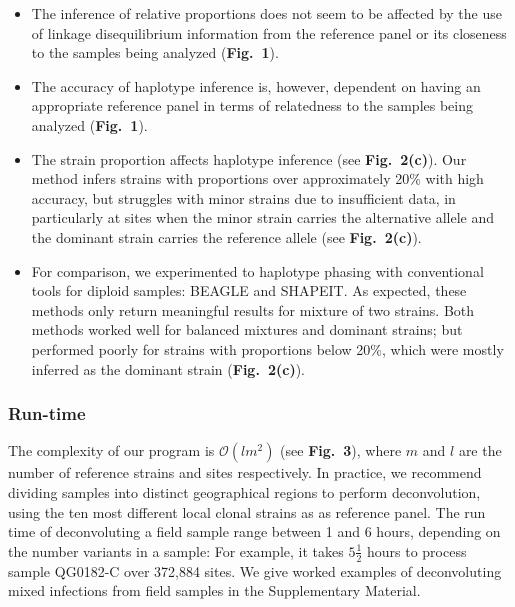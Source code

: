 \documentclass{nature}
\begin{document}
\begin{itemize}

\item The inference of relative proportions does not seem to be affected by the use of linkage disequilibrium information from the reference panel or its closeness to the samples being analyzed ({\bf Fig.~1}).

\item The accuracy of haplotype inference is, however, dependent on having an appropriate reference panel in terms of relatedness to the samples being analyzed ({\bf Fig.~1}).

\item The strain proportion affects haplotype inference (see {\bf Fig.~2(c)}). Our method infers strains with proportions over approximately 20\% with high accuracy, but struggles with minor strains due to insufficient data, in particularly at sites when the minor strain carries the alternative allele and the dominant strain carries the reference allele (see {\bf Fig.~2(c)}).

\item For comparison, we experimented to haplotype phasing with conventional tools for diploid samples: BEAGLE and SHAPEIT. As expected, these methods only return meaningful results for mixture of two strains. Both methods worked well for balanced mixtures and dominant strains; but performed poorly for strains with proportions below 20\%, which were mostly inferred as the dominant strain ({\bf Fig.~2(c)}).

\end{itemize}




\subsubsection*{Run-time}

The complexity of our program is $\mathcal{O}(lm^2)$ (see {\bf Fig.~3}), where $m$ and $l$ are the number of reference strains and sites respectively. In practice, we recommend dividing samples into distinct geographical regions to perform deconvolution, using the ten most different local clonal strains as as reference panel. The run time of deconvoluting a field sample range between 1 and 6 hours, depending on the number variants in a sample: For example, it takes $5\frac{1}{2}$ hours to process sample {\textmd QG0182-C} over 372,884 sites.  We give worked examples of deconvoluting mixed infections from field samples in the Supplementary Material.
\end{document}

